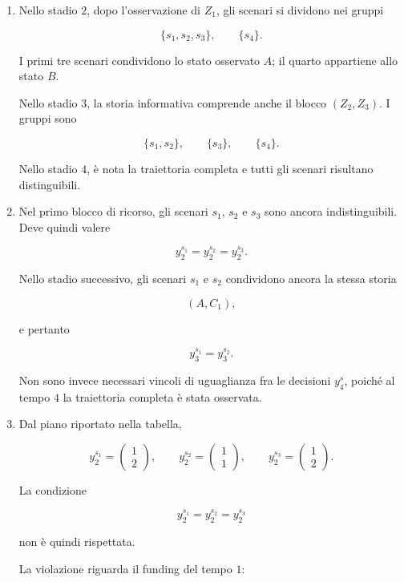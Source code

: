 \begin{enumerate}

\item Nello stadio $2$,
dopo l'osservazione di $Z_1$,
gli scenari si dividono nei gruppi

\[
\{s_1,s_2,s_3\},
\qquad
\{s_4\}.
\]

I primi tre scenari condividono
lo stato osservato $A$;
il quarto appartiene allo stato $B$.

Nello stadio $3$, la storia informativa
comprende anche il blocco $(Z_2,Z_3)$.
I gruppi sono

\[
\{s_1,s_2\},
\qquad
\{s_3\},
\qquad
\{s_4\}.
\]

Nello stadio $4$, \`e nota
la traiettoria completa e tutti
gli scenari risultano distinguibili.

\item Nel primo blocco di ricorso,
gli scenari $s_1$, $s_2$ e $s_3$
sono ancora indistinguibili.
Deve quindi valere

\[
\boxed{
y_2^{s_1}
=
y_2^{s_2}
=
y_2^{s_3}.
}
\]

Nello stadio successivo,
gli scenari $s_1$ e $s_2$
condividono ancora la stessa storia

\[
(A,C_1),
\]

e pertanto

\[
\boxed{
y_3^{s_1}=y_3^{s_2}.
}
\]

Non sono invece necessari
vincoli di uguaglianza fra
le decisioni $y_4^s$,
poich\'{e} al tempo $4$
la traiettoria completa
\`e stata osservata.

\item Dal piano riportato nella tabella,

\[
y_2^{s_1}
=
\begin{pmatrix}
1\\
2
\end{pmatrix},
\qquad
y_2^{s_2}
=
\begin{pmatrix}
1\\
1
\end{pmatrix},
\qquad
y_2^{s_3}
=
\begin{pmatrix}
1\\
2
\end{pmatrix}.
\]

La condizione

\[
y_2^{s_1}
=
y_2^{s_2}
=
y_2^{s_3}
\]

non \`e quindi rispettata.

La violazione riguarda il funding
del tempo $1$:


\end{enumerate}
